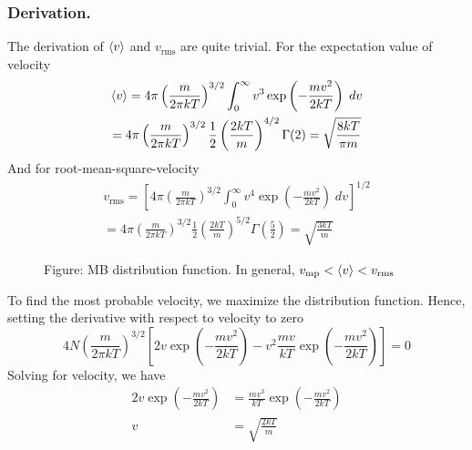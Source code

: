 \documentclass[../../../Main.tex]{subfiles}
\begin{document}
\subsubsection*{Derivation.} The derivation of $\braket{v}$ and $v_\text{rms}$ are quite trivial. For the expectation value of velocity
\begin{multline*}
    \braket{v}=4\pi \left(\frac{m}{2\pi k T}\right)^{3/2} \int_{0}^{\infty}v^3\exp\left(-\frac{m v^2}{2k T}\right)\;dv\\
    =4\pi \left(\frac{m}{2\pi k T}\right)^{3/2} \frac{1}{2}\left(\frac{2kT}{m}\right)^{4/2}\Gamma(2)=\sqrt{\frac{8kT}{\pi m}}
\end{multline*} 
And for root-mean-square-velocity
\begin{multline*}
    v_\text{rms}=\left[4\pi \left(\frac{m}{2\pi k T}\right)^{3/2} \int_{0}^{\infty}v^4\exp\left(-\frac{m v^2}{2k T}\right)\;dv\right]^{1/2}\\
    =4\pi \left(\frac{m}{2\pi k T}\right)^{3/2} \frac{1}{2}\left(\frac{2kT}{m}\right)^{5/2}\Gamma\left(\frac{5}{2}\right)=\sqrt{\frac{3kT}{m}}
\end{multline*} 
\begin{figure*}
    \centering
    \caption*{Figure: MB distribution function. In general, $v_\text{mp}<\braket{v}<v_\text{rms}$}
\end{figure*}

To find the most probable velocity, we maximize the distribution function. Hence, setting the derivative with respect to velocity to zero
\begin{equation*}
    4N\left(\frac{m}{2\pi kT}\right)^{3/2}\left[2v\exp\left(-\frac{m v^2}{2k T}\right)-v^2\frac{mv}{kT}\exp\left(-\frac{m v^2}{2k T}\right)\right]=0
\end{equation*}
Solving for velocity, we have 
\begin{align*}
    2v\exp\left(-\frac{m v^2}{2k T}\right)&=\frac{mv^3}{kT}\exp\left(-\frac{m v^2}{2k T}\right)\\
    v&=\sqrt{\frac{2kT}{m}}
\end{align*}
\end{document}
